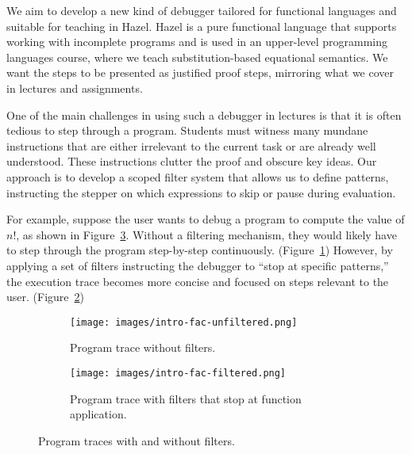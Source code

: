 
We aim to develop a new kind of debugger tailored for
functional languages and suitable for teaching in Hazel. Hazel is a pure
functional language that supports working with incomplete programs and is used
in an upper-level programming languages course, where we teach
substitution-based equational semantics. We want the steps to be presented as
justified proof steps, mirroring what we cover in lectures and assignments.


One of the main challenges in using such a debugger in lectures is
that it is often tedious to step through a program. Students must
witness many mundane instructions that are either irrelevant to the current
task or are already well understood. These instructions clutter the proof and
obscure key ideas. Our approach is to develop a scoped filter system that allows
us to define patterns, instructing the stepper on which expressions to skip or pause
during evaluation.

For example, suppose the user wants to debug
a program to compute the value of \(n!\), as shown in
Figure~\ref{fig:intro-fac}. Without a filtering mechanism,
they would likely have to step through the program step-by-step continuously.
(Figure~\ref{fig:intro-fac-unfiltered})
However, by applying a set of filters instructing the debugger to
``stop at specific patterns,'' the execution trace becomes more concise and
focused on steps relevant to the user. (Figure~\ref{fig:intro-fac-filtered})

\begin{figure}[h]
  \begin{center}
    \begin{subfigure}[t]{0.48\textwidth}
      \centering
      \texttt{[image: images/intro-fac-unfiltered.png]}
      \caption{Program trace without filters.}
      \label{fig:intro-fac-unfiltered}
    \end{subfigure}
    \quad
    \begin{subfigure}[t]{0.48\textwidth}
      \centering
      \texttt{[image: images/intro-fac-filtered.png]}
      \caption{Program trace with filters that stop at function application.}
      \label{fig:intro-fac-filtered}
    \end{subfigure}
  \end{center}
  \caption{Program traces with and without filters.}
  \label{fig:intro-fac}
\end{figure}

